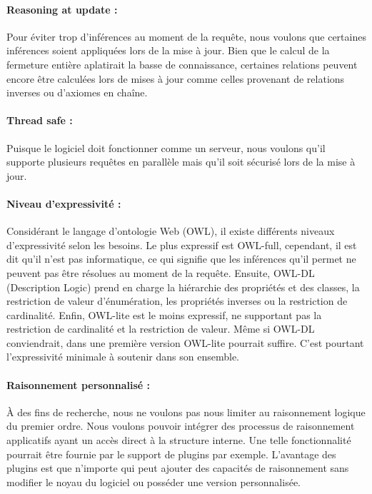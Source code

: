 \paragraph{Reasoning at update :} Pour éviter trop d'inférences au moment de la requête, nous voulons que certaines inférences soient appliquées lors de la mise à jour. Bien que le calcul de la fermeture entière aplatirait la basse de connaissance, certaines relations peuvent encore être calculées lors de mises à jour comme celles provenant de relations inverses ou d'axiomes en chaîne.

\paragraph{Thread safe :} Puisque le logiciel doit fonctionner comme un serveur, nous voulons qu'il supporte plusieurs requêtes en parallèle mais qu'il soit sécurisé lors de la mise à jour.

\paragraph{Niveau d'expressivité :} Considérant le langage d'ontologie Web (OWL), il existe différents niveaux d'expressivité selon les besoins. Le plus expressif est OWL-full, cependant, il est dit qu'il n'est pas informatique, ce qui signifie que les inférences qu'il permet ne peuvent pas être résolues au moment de la requête. Ensuite, OWL-DL (Description Logic) prend en charge la hiérarchie des propriétés et des classes, la restriction de valeur d'énumération, les propriétés inverses ou la restriction de cardinalité. Enfin, OWL-lite est le moins expressif, ne supportant pas la restriction de cardinalité et la restriction de valeur. Même si OWL-DL conviendrait, dans une première version OWL-lite pourrait suffire. C'est pourtant l'expressivité minimale à soutenir dans son ensemble.

\paragraph{Raisonnement personnalisé :} À des fins de recherche, nous ne voulons pas nous limiter au raisonnement logique du premier ordre. Nous voulons pouvoir intégrer des processus de raisonnement applicatifs ayant un accès direct à la structure interne. Une telle fonctionnalité pourrait être fournie par le support de plugins par exemple. L'avantage des plugins est que n'importe qui peut ajouter des capacités de raisonnement sans modifier le noyau du logiciel ou posséder une version personnalisée.

